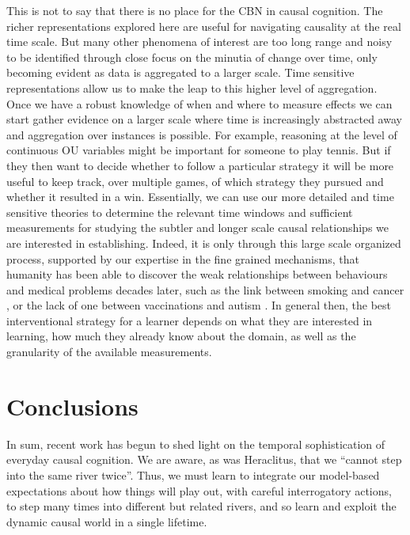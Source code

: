 \documentclass{cambridge7A}%
\providecommand{\DIFaddbegin}{} %
\providecommand{\DIFaddend}{} %
\providecommand{\DIFdelbegin}{} %
\providecommand{\DIFdelend}{} %
\newcommand{\DIFscaledelfig}{0.5}
\newlength{\DIFdelgraphicswidth} %
\newlength{\DIFdelgraphicsheight} %
\newcommand{\DIFaddincludegraphics}[2][]{{\color{blue}\fbox{\DIFOincludegraphics[#1]{#2}}}} %
\newcommand{\DIFdelincludegraphics}[2][]{%
\sbox{\DIFdelgraphicsbox}{\DIFOincludegraphics[#1]{#2}}%
\settoboxwidth{\DIFdelgraphicswidth}{\DIFdelgraphicsbox} %
\settoboxtotalheight{\DIFdelgraphicsheight}{\DIFdelgraphicsbox} %
\scalebox{\DIFscaledelfig}{%
\parbox[b]{\DIFdelgraphicswidth}{\usebox{\DIFdelgraphicsbox}\\[-\baselineskip] \rule{\DIFdelgraphicswidth}{0em}}\llap{\resizebox{\DIFdelgraphicswidth}{\DIFdelgraphicsheight}{%
\setlength{\unitlength}{\DIFdelgraphicswidth}%
\begin{picture}(1,1)%
\thicklines\linethickness{2pt} %
{\color[rgb]{1,0,0}\put(0,0){\framebox(1,1){}}}%
{\color[rgb]{1,0,0}\put(0,0){\line( 1,1){1}}}%
{\color[rgb]{1,0,0}\put(0,1){\line(1,-1){1}}}%
\end{picture}%
}\hspace*{3pt}}} %
} %
\DeclareRobustCommand{\DIFaddbegin}{\DIFOaddbegin \let\includegraphics\DIFaddincludegraphics} %
\DeclareRobustCommand{\DIFaddend}{\DIFOaddend \let\includegraphics\DIFOincludegraphics} %
\DeclareRobustCommand{\DIFdelbegin}{\DIFOdelbegin \let\includegraphics\DIFdelincludegraphics} %
\DeclareRobustCommand{\DIFdelend}{\DIFOaddend \let\includegraphics\DIFOincludegraphics} %
\begin{document}
This is not to say that there is no place for the CBN in causal cognition.  
The richer representations explored here are useful for navigating causality at the real time scale.  But many other phenomena of interest are too long range and noisy to be identified through close focus on the minutia of change over time, only becoming evident as data is aggregated to a larger scale.  Time sensitive representations allow us to make the leap to this higher level of aggregation.  Once we have a robust knowledge of when and where to measure effects we can start gather evidence on a larger scale where time is increasingly abstracted away and aggregation over instances is possible.  For example, reasoning at the level of continuous OU variables might be important for someone to play tennis. But if they then want to decide whether to follow a particular strategy it will be more useful to keep track, over multiple games, of which strategy they pursued and whether it resulted in a win.  Essentially, we can use our more detailed and time sensitive theories to determine the relevant time windows and sufficient measurements for studying the subtler and longer scale causal relationships we are interested in establishing.  Indeed, it is only through this large scale organized process, supported by our expertise in the fine grained mechanisms, that humanity has been able to discover the weak relationships between behaviours and medical problems decades later, such as the link between smoking and cancer \citep{gandini2008tobacco}, or the lack of one between vaccinations and autism \citep{verschuur1996hidden}.  In general then, the best interventional strategy for a learner depends on what they are interested in learning, how much they already know about the domain, as well as the granularity of the available measurements.

\section{Conclusions}

In sum, recent work has begun to shed light on the temporal sophistication of everyday causal cognition.  We are aware, as was Heraclitus, that we ``cannot step into the same river twice''\citep{barnes2013presocratics}.  Thus, we must learn to integrate our model-based expectations about how things will play out, with careful interrogatory actions, to step many times into different but related rivers, and so learn and exploit the dynamic causal world in a single lifetime.

\clearpage
\DIFdelbegin %
\DIFdelend \DIFaddbegin 
\DIFaddend 
\end{document}

